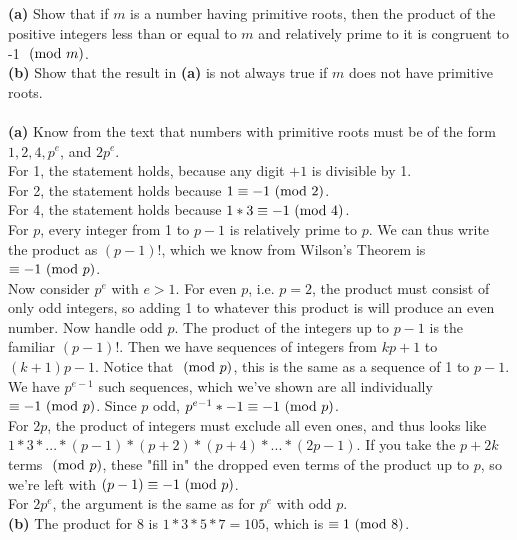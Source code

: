 \documentclass{article} \usepackage{amsmath}
\begin{document}
\subsection{}
\textbf{(a)} Show that if $m$ is a number having primitive roots, then the
product of the positive integers less than or equal to $m$ and relatively
prime to it is congruent to -1 $\ (\mathrm{mod}\ m)$.\\
\textbf{(b)} Show that the result in \textbf{(a)} is not always true if $m$
does not have primitive roots.\\~\\
\textbf{(a)} Know from the text that numbers with primitive roots
must be of the form $1, 2, 4, p^e$, and $2p^e$.\\
For 1, the statement holds, because any digit $+ 1$ is divisible by 1.\\
For 2, the statement holds because $1 \equiv -1 \ (\mathrm{mod}\ 2)$.\\
For 4, the statement holds because $1*3 \equiv -1 \ (\mathrm{mod}\ 4)$.\\
For $p$, every integer from 1 to $p - 1$ is relatively prime to $p$.
We can thus write the product as $(p - 1)!$, which we know from Wilson's
Theorem is $\equiv -1 \ (\mathrm{mod}\ p)$.\\
Now consider $p^e$ with $e > 1$.
For even $p$, i.e. $p = 2$, the product must consist of only odd integers,
so adding 1 to whatever this product is will produce an even number.
Now handle odd $p$.
The product of the integers up to $p - 1$ is the familiar $(p - 1)!$.
Then we have sequences of integers from $kp + 1$ to $(k + 1)p - 1$.
Notice that $\ (\mathrm{mod}\ p)$, this is the same as a sequence of 1 to $p - 1$.
We have $p^{e - 1}$ such sequences, which we've shown are all individually
$\equiv -1 \ (\mathrm{mod}\ p)$.
Since $p$ odd, $p^{e - 1}*-1 \equiv -1 \ (\mathrm{mod}\ p)$.\\
For $2p$, the product of integers must exclude all even ones, and thus looks
like $1*3*...*(p - 1)*(p + 2)*(p + 4)*...*(2p - 1)$.
If you take the $p + 2k$ terms $\ (\mathrm{mod}\ p)$, these "fill in" the dropped even
terms of the product up to $p$, so we're left with $(p - 1) \equiv -1 \ (\mathrm{mod}\ p)$.\\ 
For $2p^e$, the argument is the same as for $p^e$ with odd $p$.\\
\textbf{(b)} The product for $8$ is $1 * 3 * 5 * 7 = 105$,
which is $\equiv 1 \ (\mathrm{mod}\ 8)$.
\end{document}
